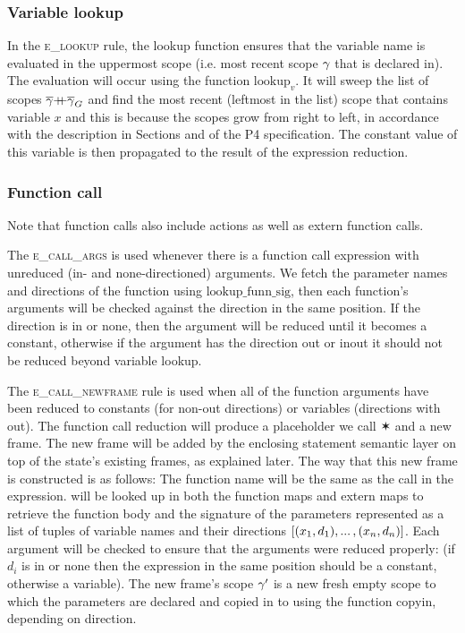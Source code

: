\documentclass[UTF8]{article}
\begin{document}
\subsubsection*{Variable lookup}
In the \textsc{e\_lookup} rule, the lookup function ensures that the variable name \vn{} is evaluated in the uppermost scope (i.e. most recent scope $\gamma$ that \vn{} is declared in). The evaluation will occur using the function $\mathrm{lookup}_v$. It will sweep the list of scopes $\overline{\gamma} {+}\mspace{-8mu}{+} \overline{\gamma}_G$ and find the most recent (leftmost in the list) scope that contains variable $x$ and this is because the scopes grow from right to left, in accordance with the description in Sections  and  of the P4 specification. The constant value of this variable is then propagated to the result of the expression reduction.

\begin{figure}[ht!]
    \ottusedrule{\ottdruleeXXlookup{}} 
\end{figure}



\subsubsection*{Function call}
Note that function calls also include actions as well as extern function calls.

The \textsc{e\_call\_args} is used whenever there is a function call expression with unreduced (in- and none-directioned) arguments. We fetch the parameter names and directions of the function using $\mathrm{lookup\_funn\_sig}$, then each function's arguments will be checked against the direction in the same position. If the direction is in or none, then the argument will be reduced until it becomes a constant, otherwise if the argument has the direction out or inout it should not be reduced beyond variable lookup.

The \textsc{e\_call\_newframe} rule is used when all of the function arguments have been reduced to constants (for non-out directions) or variables (directions with out). The function call reduction will produce a placeholder we call $\varstar$ and a new frame. The new frame will be added by the enclosing statement semantic layer on top of the state's existing frames, as explained later.
The way that this new frame is constructed is as follows: The function name \funn{} will be the same as the call in the expression. \funn{} will be looked up in both the function maps and extern maps to retrieve the function body \stmt{} and the signature of the parameters represented as a list of tuples of variable names and their directions $ [(x{}_1, d_1) , ... \, , (x{}_n, d_n) ] $. Each argument will be checked to ensure that the arguments were reduced properly: (if $d_i$ is in or none then the expression in the same position should be a constant, otherwise a variable). The new frame's scope $\gamma'$ is a new fresh empty scope to which the parameters are declared and copied in to using the function $\mathrm{copyin}$, depending on direction.
\end{document}
